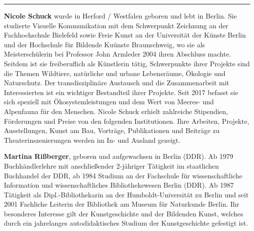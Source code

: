 \documentclass[a4paper,
fontsize=11pt,
oneside,
numbers=noperiodatend,
parskip=half-,
bibliography=totoc,
final
]{scrartcl}
\begin{document}
\begin{center}\rule{0.5\linewidth}{0.5pt}\end{center}

\textbf{Nicole Schuck} wurde in Herford / Westfalen geboren und lebt in Berlin. Sie studierte Visuelle Kommunikation mit dem Schwerpunkt Zeichnung an der Fachhochschule Bielefeld sowie Freie Kunst an der Universität der Künste Berlin und der Hochschule für Bildende Kuünste Braunschweig, wo sie als Meisterschülerin bei Professor John Armleder 2004 ihren Abschluss machte. Seitdem ist sie freiberuflich als Künstlerin tätig, Schwerpunkte ihrer Projekte sind die Themen Wildtiere, natürliche und urbane Lebensräume, Ökologie und Naturschutz. Der transdisziplinäre Austausch und die Zusammenarbeit mit Interessierten ist ein wichtiger Bestandteil ihrer Projekte. Seit 2017 befasst sie sich speziell mit Ökosystemleistungen und dem Wert von Meeres- und Alpenfauna für den Menschen. Nicole Schuck erhielt zahlreiche Stipendien, Förderungen und Preise von den folgenden Institutionen. Ihre Arbeiten, Projekte, Ausstellungen, Kunst am Bau, Vorträge, Publikationen und Beiträge zu Theaterinszenierungen werden im In- und Ausland gezeigt.

\textbf{Martina Rißberger}, geboren und aufgewachsen in Berlin (DDR). Ab 1979 Buchhändlerlehre mit anschließender 2-jähriger Tätigkeit im staatlichen Buchhandel der DDR, ab 1984 Studium an der Fachschule für wissenschaftliche Information und wissenschaftliches Bibliothekswesen Berlin (DDR). Ab 1987 Tätigkeit als Dipl.-Bibliothekarin an der Humboldt-Universität zu Berlin und seit 2001 Fachliche Leiterin der Bibliothek am Museum für Naturkunde Berlin.
Ihr besonderes Interesse gilt der Kunstgeschichte und der Bildenden Kunst, welches durch ein jahrelanges autodidaktisches Studium der Kunstgeschichte gefestigt ist.
\end{document}
